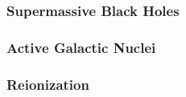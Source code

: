 \subsubsection{Supermassive Black Holes}
\label{subsubsec:smbhs}



\subsubsection{Active Galactic Nuclei}
\label{subsubsec:agn}



\subsubsection{Reionization}
\label{subsubsec:reionization}




